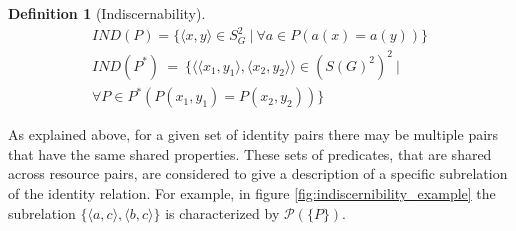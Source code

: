 \documentclass[letterpaper]{article}
\newtheorem{definition}{Definition}
\begin{document}
\begin{definition}[Indiscernability]
\begin{align}
IND(P) = \{
  \langle x, y \rangle \in S_G^2
\  \vert \ 
  \forall a \in P(a(x) = a(y))
\}
\label{def:unary_indiscernability}
\\
IND(P^*) \  = \  \{
    \langle
      \langle x_1, y_1 \rangle,
      \langle x_2, y_2 \rangle
    \rangle \in (S(G)^2)^2
  \  \vert \ 
\nonumber
\\
    \forall P \in P^*(P(x_1, y_1) = P(x_2, y_2))
  \}
\label{def:binary_indiscernability}
\end{align}
\end{definition}

As explained above, for a given set of identity pairs there may be multiple pairs that have the same shared properties. These sets of predicates, that are shared across resource pairs, are considered to give a description of a specific subrelation of the identity relation. For example, in figure \ref{fig:indiscernibility_example} the subrelation $\{ \langle a, c \rangle, \langle b, c \rangle \}$ is characterized by $\mathcal{P}(\{ P \})$.
\end{document}
